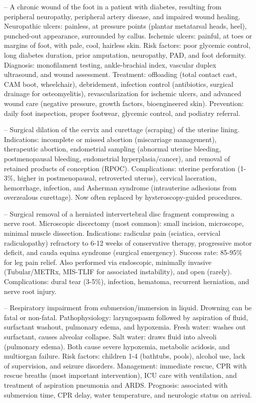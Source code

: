 -- A chronic wound of the foot in a patient with diabetes, resulting from peripheral neuropathy, peripheral artery disease, and impaired wound healing. Neuropathic ulcers: painless, at pressure points (plantar metatarsal heads, heel), punched-out appearance, surrounded by callus. Ischemic ulcers: painful, at toes or margins of foot, with pale, cool, hairless skin. Risk factors: poor glycemic control, long diabetes duration, prior amputation, neuropathy, PAD, and foot deformity. Diagnosis: monofilament testing, ankle-brachial index, vascular duplex ultrasound, and wound assessment. Treatment: offloading (total contact cast, CAM boot, wheelchair), debridement, infection control (antibiotics, surgical drainage for osteomyelitis), revascularization for ischemic ulcers, and advanced wound care (negative pressure, growth factors, bioengineered skin). Prevention: daily foot inspection, proper footwear, glycemic control, and podiatry referral.

-- Surgical dilation of the cervix and curettage (scraping) of the uterine lining. Indications: incomplete or missed abortion (miscarriage management), therapeutic abortion, endometrial sampling (abnormal uterine bleeding, postmenopausal bleeding, endometrial hyperplasia/cancer), and removal of retained products of conception (RPOC). Complications: uterine perforation (1-3\%, higher in postmenopausal, retroverted uterus), cervical laceration, hemorrhage, infection, and Asherman syndrome (intrauterine adhesions from overzealous curettage). Now often replaced by hysteroscopy-guided procedures.

-- Surgical removal of a herniated intervertebral disc fragment compressing a nerve root. Microscopic discectomy (most common): small incision, microscope, minimal muscle dissection. Indications: radicular pain (sciatica, cervical radiculopathy) refractory to 6-12 weeks of conservative therapy, progressive motor deficit, and cauda equina syndrome (surgical emergency). Success rate: 85-95\% for leg pain relief. Also performed via endoscopic, minimally invasive (Tubular/METRx, MIS-TLIF for associated instability), and open (rarely). Complications: dural tear (3-5\%), infection, hematoma, recurrent herniation, and nerve root injury.

-- Respiratory impairment from submersion/immersion in liquid. Drowning can be fatal or non-fatal. Pathophysiology: laryngospasm followed by aspiration of fluid, surfactant washout, pulmonary edema, and hypoxemia. Fresh water: washes out surfactant, causes alveolar collapse. Salt water: draws fluid into alveoli (pulmonary edema). Both cause severe hypoxemia, metabolic acidosis, and multiorgan failure. Risk factors: children 1-4 (bathtubs, pools), alcohol use, lack of supervision, and seizure disorders. Management: immediate rescue, CPR with rescue breaths (most important intervention), ICU care with ventilation, and treatment of aspiration pneumonia and ARDS. Prognosis: associated with submersion time, CPR delay, water temperature, and neurologic status on arrival.

